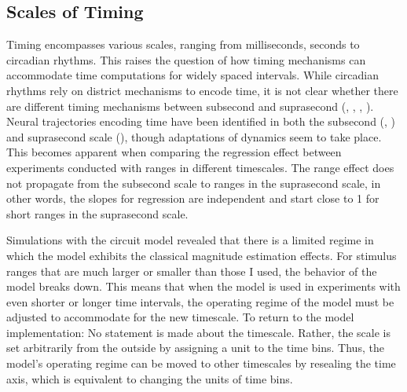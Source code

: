 \documentclass[10pt]{article}
\begin{document}
\subsection{Scales of Timing}
Timing encompasses various scales, ranging from milliseconds, seconds to circadian rhythms. This raises the question of how timing mechanisms can accommodate time computations for widely spaced intervals. 
While circadian rhythms rely on district mechanisms to encode time, it is not clear whether there are different timing mechanisms between subsecond and suprasecond (\cite{Buonomano2002}, \cite{Buonomano2007}, \cite{Paton2018}, \cite{Tsao2022}). %
Neural trajectories encoding time have been identified in both the subsecond (\cite{Sohn2019}, \cite{Meirhaeghe2021}) and suprasecond scale (\cite{Henke2021}), though adaptations of dynamics seem to take place.
This becomes apparent when comparing the regression effect between experiments conducted with ranges in different timescales. 
The range effect does not propagate from the subsecond scale to ranges in the suprasecond scale, in other words, the slopes for regression are independent and start close to 1 for short ranges in the suprasecond scale. 

Simulations with the circuit model revealed that there is a limited regime in which the model exhibits the classical magnitude estimation effects. 
For stimulus ranges that are much larger or smaller than those I used, the behavior of the model breaks down.
This means that when the model is used in experiments with even shorter or longer time intervals, the operating regime of the model must be adjusted to accommodate for the new timescale.
To return to the model implementation: No statement is made about the timescale.  Rather, the scale is set arbitrarily from the outside by assigning a unit to the time bins. Thus, the model's operating regime can be moved to other timescales by resealing the time axis, which is equivalent to changing the units of time bins.
\end{document}

